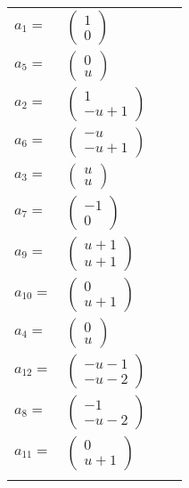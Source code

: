 \documentclass[1p]{elsarticle_modified}
\theoremstyle{definition}
\begin{document}
\begin{tabular}{m{7pt} m{180pt} m{7pt} m{180pt} }
\flushright $a_{1}=$&$\begin{pmatrix}1\\0\end{pmatrix}$ \\
\flushright $a_{5}=$&$\begin{pmatrix}0\\u\end{pmatrix}$ \\
\flushright $a_{2}=$&$\begin{pmatrix}1\\- u+1\end{pmatrix}$ \\
\flushright $a_{6}=$&$\begin{pmatrix}- u\\- u+1\end{pmatrix}$ \\
\flushright $a_{3}=$&$\begin{pmatrix}u\\u\end{pmatrix}$ \\
\flushright $a_{7}=$&$\begin{pmatrix}-1\\0\end{pmatrix}$ \\
\flushright $a_{9}=$&$\begin{pmatrix}u+1\\u+1\end{pmatrix}$ \\
\flushright $a_{10}=$&$\begin{pmatrix}0\\u+1\end{pmatrix}$ \\
\flushright $a_{4}=$&$\begin{pmatrix}0\\u\end{pmatrix}$ \\
\flushright $a_{12}=$&$\begin{pmatrix}- u-1\\- u-2\end{pmatrix}$ \\
\flushright $a_{8}=$&$\begin{pmatrix}-1\\- u-2\end{pmatrix}$ \\
\flushright $a_{11}=$&$\begin{pmatrix}0\\u+1\end{pmatrix}$\\&\end{tabular}
\end{document}
